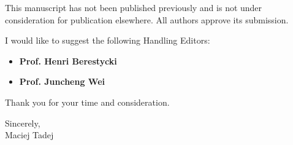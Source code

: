 \documentclass[11pt, a4paper]{article}
\begin{document}
This manuscript has not been published previously and is not under consideration for publication elsewhere. All authors approve its submission.

I would like to suggest the following Handling Editors:
\begin{itemize}
    \item \textbf{Prof. Henri Berestycki}
    \item \textbf{Prof. Juncheng Wei}
\end{itemize}

Thank you for your time and consideration.

\vspace{1em}

\begin{flushright}
Sincerely, \\
Maciej Tadej
\end{flushright}
\end{document}

